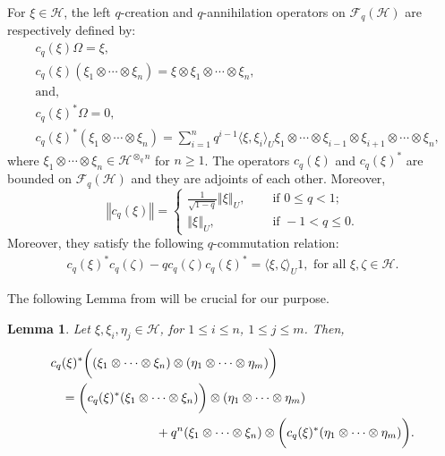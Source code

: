 \documentclass[12pt, a4paper,reqno]{amsart}
\newtheorem{Lemma}[Theorem]{Lemma}
\theoremstyle{definition}
\renewcommand{\leq}{\leqslant}
\renewcommand{\geq}{\geqslant}
\newcommand{\CF}{\mathcal{F}}
\newcommand{\CH}{\mathcal{H}}
\newcommand{\norm}[1]{\left\Vert#1\right\Vert}
\begin{document}
For $\xi\in \CH $, the left $q$-creation and $q$-annihilation operators on $\CF_q(\CH) $ are respectively defined by:
\begin{align}\label{Leftmult}
&c_q(\xi)\Omega  = \xi, \\ 
\nonumber&c_q(\xi) (\xi_1 \otimes \cdots\otimes \xi_n) =\xi \otimes  \xi_1 \otimes \cdots \otimes \xi_n,\\
\nonumber&\text{and},\\
\nonumber&c_q(\xi)^*\Omega  = 0,\\ 
\nonumber&c_q(\xi)^* (\xi_1 \otimes \cdots\otimes \xi_n) = \sum_{i = 1}^n{q^{i-1}}
\langle   \xi , \xi_i\rangle_U \xi_1 \otimes \cdots \otimes \xi_{i-1} \otimes \xi_{i+1} \otimes \cdots \otimes \xi_n, 
\end{align}
where $\xi_1 \otimes \cdots\otimes \xi_n\in \CH^{\otimes_{q} n}$ for $n\geq 1$.
The operators $c_q(\xi)$ and $c_q(\xi)^* $ are bounded on $ \CF_q(\CH) $ and they are 
adjoints of each other. Moreover,  
\begin{equation}\label{NormCreation}
\norm{c_q(\xi)} =\begin{cases} \frac{1}{\sqrt{1-q}} \norm{\xi}_U, \quad &\text{ if } 0\leq q < 1;\\
\norm{\xi}_U, \quad &\text{ if } -1 <  q \leq  0.\end{cases}	
\end{equation}
Moreover, they satisfy the following $q$-commutation relation:
\begin{align}\label{Commutationrelation}
c_q(\xi)^* c_q(\zeta) -q c_q(\zeta) c_q(\xi)^* = \langle \xi, \zeta  \rangle_U 1, \text{ for all } \xi,\zeta\in \CH.
\end{align}


The following Lemma from \cite{bik-kunal} will be crucial for our purpose. 

\begin{Lemma}\cite[Lemma 2.3]{bik-kunal}\label{SplitAdjoint}
Let $\xi, \xi_i, \eta_j \in \CH$, for $1\leq i\leq n$, $1\leq j\leq m$. Then, 
\begin{align*} 
c_q&(\xi)^* \bigg( (\xi_1  \otimes \cdots \otimes \xi_n) \otimes (\eta_1 \otimes \cdots \otimes \eta_m)\bigg)\\
&= \bigg(c_q(\xi)^*(\xi_1\otimes \cdots \otimes \xi_n)\bigg) \otimes (\eta_1 \otimes \cdots \otimes \eta_m)\\
&\indent\indent\indent\indent\indent+q^n 
(\xi_1  \otimes \cdots \otimes \xi_n) \otimes \bigg(c_q(\xi)^*(\eta_1 \otimes \cdots \otimes \eta_m) \bigg).
\end{align*} 
\end{Lemma}
\end{document}
